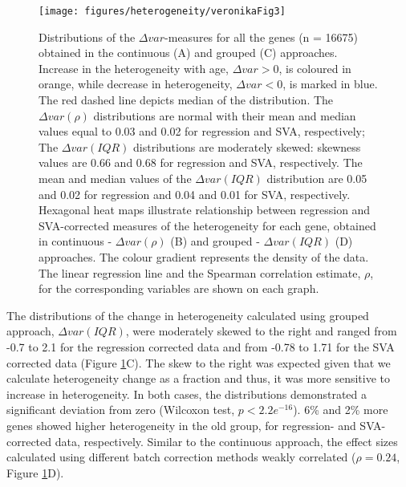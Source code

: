 \documentclass[12pt,twoside]{unicam}
\begin{document}
\begin{figure}

{\centering \texttt{[image: figures/heterogeneity/veronikaFig3]} 

}

\caption[Transcriptome-wide change in gene expression heterogeneity in ageing, using SVA and linear regression combined with continuous and grouped approaches.]{Distributions of the $\Delta var$-measures for all the genes (n = 16675) obtained in the continuous (A) and grouped (C) approaches. Increase in the heterogeneity with age, $\Delta var > 0$, is coloured in orange, while decrease in heterogeneity, $\Delta var < 0$, is marked in blue. The red dashed  line depicts median of the distribution. The $\Delta var(\rho)$ distributions are normal with their mean and median values equal to  0.03  and  0.02  for  regression  and  SVA,  respectively;  The  $\Delta var(IQR)$    distributions  are  moderately  skewed:  skewness  values  are  0.66  and  0.68  for  regression  and  SVA,  respectively.  The  mean  and  median  values  of  the  $\Delta var(IQR)$  distribution  are  0.05  and  0.02  for  regression and 0.04 and 0.01 for SVA, respectively. Hexagonal heat maps illustrate relationship between regression and SVA-corrected measures  of  the  heterogeneity  for  each  gene,  obtained  in  continuous  - $\Delta var(\rho)$  (B)  and  grouped  - $\Delta var(IQR)$  (D)  approaches.  The  colour  gradient represents the density of the data. The linear regression line and the Spearman correlation estimate, $\rho$, for the corresponding variables are shown on each graph.}\label{fig:veronikaFig3}
\end{figure}

The distributions of the change in heterogeneity calculated using grouped approach, \(\Delta var(IQR)\), were moderately skewed to the right and ranged from -0.7 to 2.1 for the regression corrected data and from -0.78 to 1.71 for the SVA corrected data (Figure \ref{fig:veronikaFig3}C). The skew to the right was expected given that we calculate heterogeneity change as a fraction and thus, it was more sensitive to increase in heterogeneity. In both cases, the distributions demonstrated a significant deviation from zero (Wilcoxon test, \(p<2.2e^{-16}\)). 6\% and 2\% more genes showed higher heterogeneity in the old group, for regression- and SVA-corrected data, respectively. Similar to the continuous approach, the effect sizes calculated using different batch correction methods weakly correlated (\(\rho = 0.24\), Figure \ref{fig:veronikaFig3}D).
\end{document}
